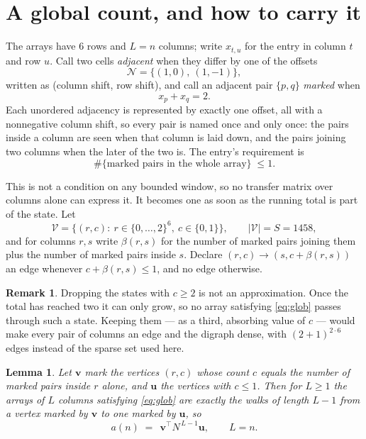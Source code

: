 \documentclass[11pt,a4paper]{article}
\theoremstyle{plain}
\newtheorem{lemma}[theorem]{Lemma}
\theoremstyle{definition}
\newtheorem{remark}[theorem]{Remark}
\begin{document}
\section{A global count, and how to carry it}

The arrays have $6$ rows and $L=n$ columns; write $x_{t,u}$ for the entry in
column $t$ and row $u$. Call two cells \emph{adjacent} when they differ by one of the
offsets
\[
\mathcal N=\{(1,0),\ (1,-1)\},
\]
written as (column shift, row shift), and call an adjacent pair $\{p,q\}$
\emph{marked} when
\[
x_{p}+x_{q}=2 .
\]
Each unordered adjacency is represented by exactly one offset, all with a nonnegative column
shift, so every pair is named once and only once: the pairs inside a column are seen when
that column is laid down, and the pairs joining two columns when the later of the two is. The
entry's requirement is
\begin{equation}\label{eq:glob}
\#\{\text{marked pairs in the whole array}\}\;\le1.
\end{equation}

This is not a condition on any bounded window, so no transfer matrix over columns alone can
express it. It becomes one as soon as the running total is part of the state. Let
\[
\mathcal V=\bigl\{(r,c):\ r\in\{0,\dots,2\}^{6},\ c\in\{0,1\}\bigr\},
\qquad |\mathcal V|=S=1458,
\]
and for columns $r,s$ write $\beta(r,s)$ for the number of marked pairs joining them plus the
number of marked pairs inside $s$. Declare $(r,c)\to(s,c+\beta(r,s))$ an edge whenever
$c+\beta(r,s)\le1$, and no edge otherwise.

\begin{remark}
Dropping the states with $c\ge2$ is not an approximation. Once the total has reached two it
can only grow, so no array satisfying \eqref{eq:glob} passes through such a state. Keeping
them --- as a third, absorbing value of $c$ --- would make every pair of columns an edge and
the digraph dense, with $(2+1)^{2\cdot6}$ edges instead of the sparse set used here.
\end{remark}

\begin{lemma}\label{lem:walk}
Let $\mathbf{v}$ mark the vertices $(r,c)$ whose count $c$ equals the number of marked pairs
inside $r$ alone, and $\mathbf{u}$ the vertices with $c\le1$. Then for $L\ge1$ the arrays
of $L$ columns satisfying \eqref{eq:glob} are exactly the walks of length $L-1$ from a
vertex marked by $\mathbf{v}$ to one marked by $\mathbf{u}$, so
\[
a(n)\;=\;\,\mathbf{v}^{\!\top}N^{\,L-1}\mathbf{u},\qquad L=n .
\]
\end{lemma}
\end{document}
